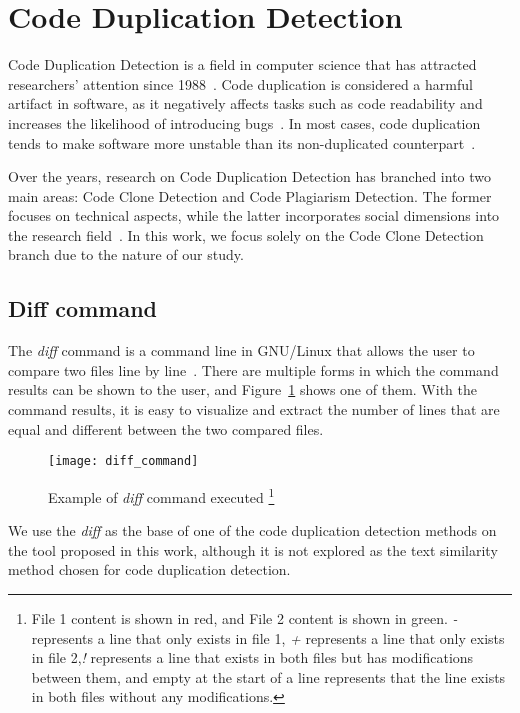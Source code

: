 \en

\section{Code Duplication Detection}

Code Duplication Detection is a field in computer science that has attracted
researchers' attention since 1988~\citep{firstman}. Code
duplication is considered a harmful artifact in software, as it negatively
affects tasks such as code readability and increases the likelihood of
introducing bugs~\citep{harmone}. In most cases, code duplication tends to make
software more unstable than its non-duplicated counterpart~\citep{harmtwo}.

Over the years, research on Code Duplication Detection has branched into two
main areas: Code Clone Detection and Code Plagiarism Detection. The former
focuses on technical aspects, while the latter incorporates social dimensions
into the research field~\citep{litreview}. In this work, we focus solely on the
Code Clone Detection branch due to the nature of our study.


\subsection{Diff command}

The \textit{diff} command is a command line in GNU/Linux that allows the user to compare 
two files line by line~\citep{diffcommand}. There are multiple forms in which the command 
results can be shown to the user, and Figure~\ref{fig:diff} shows one of them. 
With the command results, it is easy to visualize and extract the number of lines that 
are equal and different between the two compared files.

\begin{figure}
\texttt{[image: diff\_command]}
\caption[Example of \textit{diff} command executed]{
Example of \textit{diff} command executed
\footnote{
File 1 content is shown in red, and File 2 content is shown in green. \textit{-} 
represents a line that only exists in file 1, \textit{+} represents a line that only 
exists in file 2,\textit{!} represents a line that exists in both files but has modifications 
between them, and empty at the start of a line represents that the line exists in 
both files without any modifications.
}
}
\label{fig:diff}
\end{figure}

We use the \textit{diff} as the base of one of the code duplication detection 
methods on the tool proposed in this work, although it is not explored as the text 
similarity method chosen for code duplication detection.

